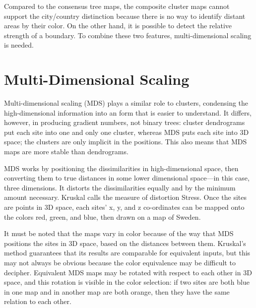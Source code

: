 \begin{sloppypar}
  Compared to the consensus tree maps, the composite cluster maps
  cannot support the city/country distinction because there is no way
  to identify distant areas by their color. On the other hand, it is
  possible to detect the relative strength of a boundary. To combine
  these two features, multi-dimensional scaling is needed.
\end{sloppypar}



\section{Multi-Dimensional Scaling}
\label{section-mds}

\begin{sloppypar}
  Multi-dimensional scaling (MDS) plays a similar role to clusters,
  condensing the high-dimensional information into an form that is
  easier to understand. It differs, however, in producing gradient
  numbers, not binary trees: cluster dendrograms put each site into
  one and only one cluster, whereas MDS puts each site into 3D space;
  the clusters are only implicit in the positions.  This also means
  that MDS maps are more stable than dendrograms.
\end{sloppypar}

 MDS works by positioning the dissimilarities in
high-dimensional space, then converting them to true distances in some
lower dimensional space---in this case, three dimensions. It distorts
the dissimilarities equally and by the minimum amount
necessary. Kruskal calls the measure of distortion Stress. Once the
sites are points in 3D space, each sites' x, y, and z co-ordinates can
be mapped onto the colors red, green, and blue, then drawn on a map of
Sweden.

It must be noted that the maps vary in color because of the way that
MDS positions the sites in 3D space, based on the distances between
them. Kruskal's method guarantees that its results are comparable for
equivalent inputs, but this may not always be obvious because the
color equivalence may be difficult to decipher. Equivalent MDS maps
may be rotated with respect to each other in 3D space, and this
rotation is visible in the color selection: if two sites are both blue
in one map and in another map are both orange, then they have the same
relation to each other.


